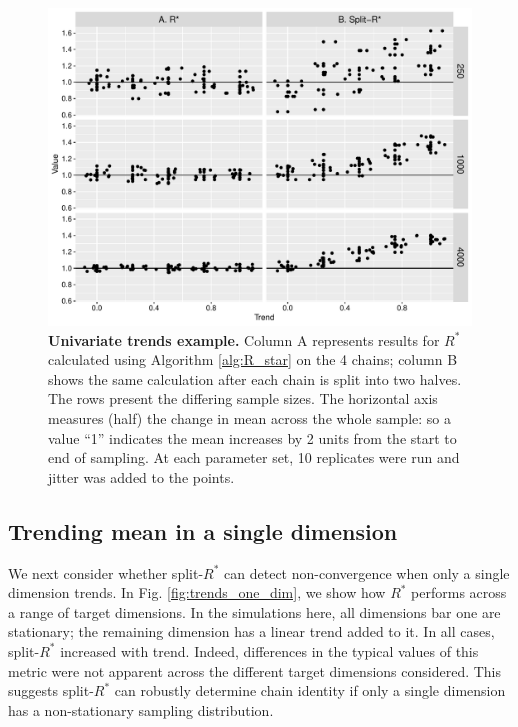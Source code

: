 \documentclass{article}
\begin{document}
\begin{figure}[!htb]
	\centerline{\includegraphics[width=1.0\textwidth]{../output/trends_all_dim.pdf}}
	\caption{\textbf{Univariate trends example.} Column A represents results for $R^*$ calculated using Algorithm \ref{alg:R_star} on the 4 chains; column B  shows the same calculation after each chain is split into two halves. The rows present the differing sample sizes. The horizontal axis measures (half) the change in mean across the whole sample: so a value ``1'' indicates the mean increases by 2 units from the start to end of sampling. At each parameter set, 10 replicates were run and jitter was added to the points.}
	\label{fig:trends_all_dim}
\end{figure}

\subsection{Trending mean in a single dimension}\label{sec:non-stationary_single}
We next consider whether split-$R^*$ can detect non-convergence when only a single dimension trends. In Fig. \ref{fig:trends_one_dim}, we show how $R^*$ performs across a range of target dimensions. In the simulations here, all dimensions bar one are stationary; the remaining dimension has a linear trend added to it. In all cases, split-$R^*$ increased with trend. Indeed, differences in the typical values of this metric were not apparent across the different target dimensions considered. This suggests split-$R^*$ can robustly determine chain identity if only a single dimension has a non-stationary sampling distribution.
\end{document}
